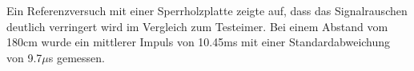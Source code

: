 Ein Referenzversuch mit einer Sperrholzplatte zeigte auf, dass das 
Signalrauschen deutlich verringert wird im Vergleich zum Testeimer. 
Bei einem Abstand vom 180cm wurde ein mittlerer Impuls von 10.45ms mit einer
Standardabweichung von 9.7$\mu$s gemessen.

